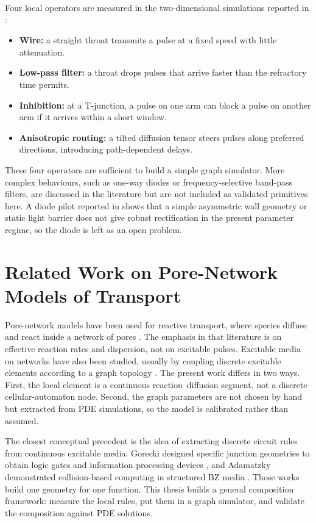 Four local operators are measured in the two-dimensional simulations reported in :

\begin{itemize}
    \item \textbf{Wire:} a straight throat transmits a pulse at a fixed speed with little attenuation.
    \item \textbf{Low-pass filter:} a throat drops pulses that arrive faster than the refractory time permits.
    \item \textbf{Inhibition:} at a T-junction, a pulse on one arm can block a pulse on another arm if it arrives within a short window.
    \item \textbf{Anisotropic routing:} a tilted diffusion tensor steers pulses along preferred directions, introducing path-dependent delays.
\end{itemize}

These four operators are sufficient to build a simple graph simulator.
More complex behaviours, such as one-way diodes or frequency-selective band-pass filters, are discussed in the literature but are not included as validated primitives here.
A diode pilot reported in  shows that a simple asymmetric wall geometry or static light barrier does not give robust rectification in the present parameter regime, so the diode is left as an open problem.

\section{Related Work on Pore-Network Models of Transport}
\label{sec:porous_related}

Pore-network models have been used for reactive transport, where species diffuse and react inside a network of pores \cite{xiong2016review, meakin2009modeling}.
The emphasis in that literature is on effective reaction rates and dispersion, not on excitable pulses.
Excitable media on networks have also been studied, usually by coupling discrete excitable elements according to a graph topology \cite{kinouchi2006optimal}.
The present work differs in two ways.
First, the local element is a continuous reaction--diffusion segment, not a discrete cellular-automaton node.
Second, the graph parameters are not chosen by hand but extracted from PDE simulations, so the model is calibrated rather than assumed.

The closest conceptual precedent is the idea of extracting discrete circuit rules from continuous excitable media.
Gorecki \etal designed specific junction geometries to obtain logic gates and information processing devices \cite{gorecki2009information}, and Adamatzky demonstrated collision-based computing in structured BZ media \cite{adamatzky2002collision}.
Those works build one geometry for one function.
This thesis builds a general composition framework: measure the local rules, put them in a graph simulator, and validate the composition against PDE solutions.
